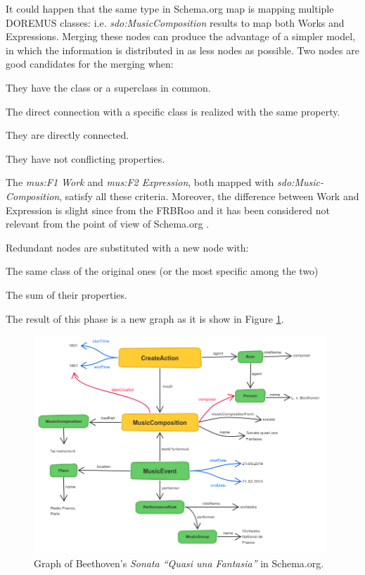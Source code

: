 \documentclass{llncs}
\begin{document}
It could happen that the same type in Schema.org map is mapping multiple DOREMUS classes: i.e. \textit{sdo:MusicComposition} results to map both Works and Expressions. Merging these nodes can produce the advantage of a simpler model, in which the information is distributed in as less nodes as possible. Two nodes are good candidates for the merging when:
\begin{enumerate*}
\item{They have the class or a superclass in common.}
\item{The direct connection with a specific class is realized with the same property.}
\item{They are directly connected.}
\item{They have not conflicting properties.}
\end{enumerate*} The \textit{mus:F1 Work} and \textit{mus:F2 Expression}, both mapped with \textit{sdo:Music-Composition}, satisfy all these criteria. Moreover, the difference between Work and Expression is slight since from the FRBRoo and it has been considered not relevant from the point of view of Schema.org \cite{godby2013relationship}.

Redundant nodes are substituted with a new node with:
\begin{enumerate*}
\item{The same class of the original ones (or the most specific among the two)}
\item{The sum of their properties.}
\end{enumerate*}
The result of this phase is a new graph as it is show in Figure \ref{fig:beet-schema}.

\begin{figure}
\centering
\includegraphics[width=11cm]{img/Beethoven-Schema.png}
\caption{Graph of Beethoven's \textit{Sonata ``Quasi una Fantasia''} in Schema.org.}
\label{fig:beet-schema}
\end{figure}
\end{document}
